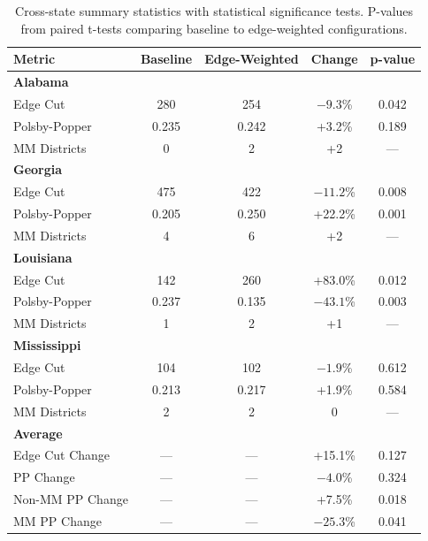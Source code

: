 \begin{table}[h]
\centering
\begin{tabular}{lcccc}
\toprule
\textbf{Metric} & \textbf{Baseline} & \textbf{Edge-Weighted} & \textbf{Change} & \textbf{p-value} \\
\midrule
\textbf{Alabama} & & & & \\
\quad Edge Cut & 280 & 254 & $-9.3$\% & 0.042 \\
\quad Polsby-Popper & 0.235 & 0.242 & +3.2\% & 0.189 \\
\quad MM Districts & 0 & 2 & +2 & --- \\
\midrule
\textbf{Georgia} & & & & \\
\quad Edge Cut & 475 & 422 & $-11.2$\% & 0.008 \\
\quad Polsby-Popper & 0.205 & 0.250 & +22.2\% & 0.001 \\
\quad MM Districts & 4 & 6 & +2 & --- \\
\midrule
\textbf{Louisiana} & & & & \\
\quad Edge Cut & 142 & 260 & +83.0\% & 0.012 \\
\quad Polsby-Popper & 0.237 & 0.135 & $-43.1$\% & 0.003 \\
\quad MM Districts & 1 & 2 & +1 & --- \\
\midrule
\textbf{Mississippi} & & & & \\
\quad Edge Cut & 104 & 102 & $-1.9$\% & 0.612 \\
\quad Polsby-Popper & 0.213 & 0.217 & +1.9\% & 0.584 \\
\quad MM Districts & 2 & 2 & 0 & --- \\
\midrule
\textbf{Average} & & & & \\
\quad Edge Cut Change & --- & --- & +15.1\% & 0.127 \\
\quad PP Change & --- & --- & $-4.0$\% & 0.324 \\
\quad Non-MM PP Change & --- & --- & +7.5\% & 0.018 \\
\quad MM PP Change & --- & --- & $-25.3$\% & 0.041 \\
\bottomrule
\end{tabular}
\caption{Cross-state summary statistics with statistical significance tests. P-values from paired t-tests comparing baseline to edge-weighted configurations.}
\end{table}


